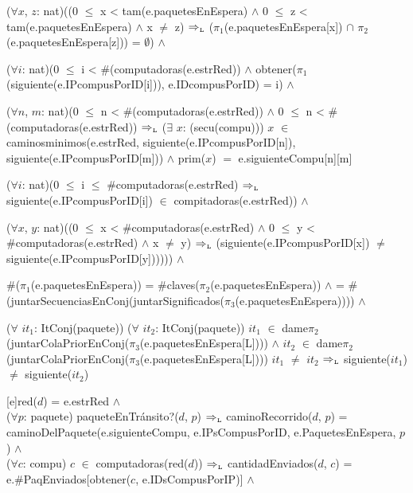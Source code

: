 \begin{Representacion}
{%
    ($\forall x$, $z$: nat)((0 $\leq$ x < tam(e.paquetesEnEspera) $\land$ 0 $\leq$ z < tam(e.paquetesEnEspera) $\land$ x $\neq$ z) $\Rightarrow_{\mathrm{\scriptscriptstyle{L}}}$ ($\pi_1$(e.paquetesEnEspera[x]) $\cap$ $\pi_2$(e.paquetesEnEspera[z])) = $\emptyset$) $\land$

		($\forall i$: nat)(0 $\leq$ i < \#(computadoras(e.estrRed)) $\land$ obtener($\pi_1$(siguiente(e.IPcompusPorID[i])), e.IDcompusPorID) = i) $\land$

		($\forall n$, $m$: nat)(0 $\leq$ n < \#(computadoras(e.estrRed)) $\land$ 0 $\leq$ n < \#(computadoras(e.estrRed)) $\Rightarrow_{\mathrm{\scriptscriptstyle{L}}}$ ($\exists$ $x$: (secu(compu))) $x$ $\in$ caminosminimos(e.estrRed, siguiente(e.IPcompusPorID[n]), siguiente(e.IPcompusPorID[m])) $\land$ prim($x$) $=$ e.siguienteCompu[n][m] 

    ($\forall i$: nat)(0 $\leq$ i $\leq$ \#computadoras(e.estrRed) $\Rightarrow_{\mathrm{\scriptscriptstyle{L}}}$ siguiente(e.IPcompusPorID[i]) $\in$ compitadoras(e.estrRed)) $\land$

    ($\forall x$, $y$: nat)((0 $\leq$ x < \#computadoras(e.estrRed) $\land$ 0 $\leq$ y < \#computadoras(e.estrRed) $\land$ x $\neq$ y) $\Rightarrow_{\mathrm{\scriptscriptstyle{L}}}$ (siguiente(e.IPcompusPorID[x]) $\neq$ siguiente(e.IPcompusPorID[y]))))) $\land$

    \#($\pi_1$(e.paquetesEnEspera)) = \#claves($\pi_2$(e.paquetesEnEspera)) $\land$ = \#(juntarSecuenciasEnConj(juntarSignificados($\pi_3$(e.paquetesEnEspera)))) $\land$

    ($\forall$ $it_{1}$: ItConj(paquete)) ($\forall$ $it_{2}$: ItConj(paquete)) $it_{1}$ $\in$ dame$\pi_{2}$(juntarColaPriorEnConj($\pi_{3}$(e.paquetesEnEspera[L]))) $\land$ $it_{2}$ $\in$ dame$\pi_{2}$(juntarColaPriorEnConj($\pi_{3}$(e.paquetesEnEspera[L]))) $it_{1}$ $\neq$ $it_{2}$ $\Rightarrow_{\mathrm{\scriptscriptstyle{L}}}$ siguiente($it_{1}$) $\neq$ siguiente($it_{2}$)
    }\mbox{} %


[e]{red($d$) = e.estrRed $\land$ \\

  ($\forall p$: paquete) paqueteEnTr\'ansito?($d$, $p$) $\Rightarrow_{\mathrm{\scriptscriptstyle{L}}}$ caminoRecorrido($d$, $p$) = caminoDelPaquete(e.siguienteCompu, e.IPsCompusPorID, e.PaquetesEnEspera, $p$) $\land$ \\

  ($\forall c$: compu) $c$ $\in$ computadoras(red($d$)) $\Rightarrow_{\mathrm{\scriptscriptstyle{L}}}$ cantidadEnviados($d$, $c$) = e.\#PaqEnviados[obtener($c$, e.IDsCompusPorIP)] $\land$ \\

}
\end{Representacion}
